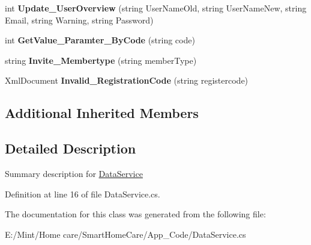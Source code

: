 \begin{DoxyCompactItemize}
\item 
\hypertarget{class_data_service_a76b7287a917e2f3dd7b9d68a0a46eaa0}{int {\bfseries Update\-\_\-\-User\-Overview} (string User\-Name\-Old, string User\-Name\-New, string Email, string Warning, string Password)}\label{class_data_service_a76b7287a917e2f3dd7b9d68a0a46eaa0}

\item 
\hypertarget{class_data_service_abe3d14a65809c4c59c83b24561331df6}{int {\bfseries Get\-Value\-\_\-\-Paramter\-\_\-\-By\-Code} (string code)}\label{class_data_service_abe3d14a65809c4c59c83b24561331df6}

\item 
\hypertarget{class_data_service_a0b3d652fd7b4e8e416c8de91728ce50d}{string {\bfseries Invite\-\_\-\-Membertype} (string member\-Type)}\label{class_data_service_a0b3d652fd7b4e8e416c8de91728ce50d}

\item 
\hypertarget{class_data_service_ae8eed2a2ac838f1f87d0b2dc7fe559c4}{Xml\-Document {\bfseries Invalid\-\_\-\-Registration\-Code} (string registercode)}\label{class_data_service_ae8eed2a2ac838f1f87d0b2dc7fe559c4}

\end{DoxyCompactItemize}
\subsection*{Additional Inherited Members}


\subsection{Detailed Description}
Summary description for \hyperlink{class_data_service}{Data\-Service} 



Definition at line 16 of file Data\-Service.\-cs.



The documentation for this class was generated from the following file\-:\begin{DoxyCompactItemize}
\item 
E\-:/\-Mint/\-Home care/\-Smart\-Home\-Care/\-App\-\_\-\-Code/Data\-Service.\-cs\end{DoxyCompactItemize}
